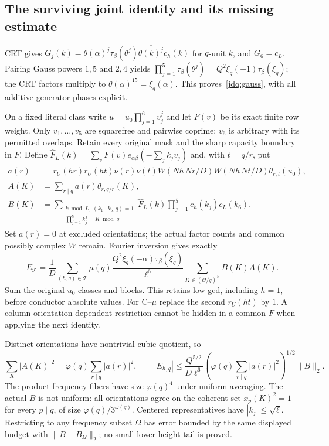 \subsection{The surviving joint identity and its missing estimate}\label{jdq:details}
CRT gives $G_j(k)=\theta(\alpha)^j\tau_\beta(\theta^j)
\overline{\theta(k)^j}c_h(k)$ for $q$-unit $k$, and $G_6=c_L$.
Pairing Gauss powers $1,5$ and $2,4$ yields
$\prod_{j=1}^5\tau_\beta(\theta^j)=Q^2\xi_q(-1)\tau_\beta(\xi_q)$;
the CRT factors multiply to $\theta(\alpha)^{15}=\xi_q(\alpha)$.
This proves~\eqref{jdq:gauss}, with all additive-generator phases explicit.

On a fixed literal class write $u=u_0\prod_{j=1}^6v_j^j$ and let $F(v)$
be its exact finite row weight. Only $v_1,\ldots,v_5$ are squarefree and
pairwise coprime; $v_6$ is arbitrary with its permitted overlaps.
Retain every original mask and the sharp capacity boundary in $F$.
Define $\widehat F_L(k)=\sum_vF(v)e_{\alpha\beta}(-\sum_jk_jv_j)$ and,
with $t=q/r$, put
\begin{align*}
 a(r)&=r_U(hr)r_U(ht)\nu(r)\overline{\nu(t)}
 W(Nh\,Nr/D)\overline{W(Nh\,Nt/D)}\theta_{r,t}(u_0),\\
 A(K)&=\sum_{r\mid q}a(r)\overline{\theta_{r,q/r}(K)},\\
 B(K)&=\sum_{\substack{k\bmod L,\ (k_1\cdots k_5,q)=1\\
                   \prod_{j=1}^5k_j^j=K\bmod q}}
       \widehat F_L(k)\prod_{j=1}^5c_h(k_j)c_L(k_6).
\end{align*}
Set $a(r)=0$ at excluded orientations; the actual factor counts and
common possibly complex $W$ remain. Fourier inversion gives exactly
\begin{equation}\label{jdq:joint}
 E_{\mathcal T}=\frac1D\sum_{(h,q)\in\mathcal T}
 \mu(q)\frac{Q^2\xi_q(-\alpha)\tau_\beta(\xi_q)}{\ell^6}
 \sum_{K\in(\mathcal O/q)^\times}B(K)A(K).
\end{equation}
Sum the original $u_0$ classes and blocks. This retains low gcd,
including $h=1$, before conductor absolute values. For C--$\mu$ replace
the second $r_U(ht)$ by $1$. A column-orientation-dependent restriction
cannot be hidden in a common $F$ when applying the next identity.

Distinct orientations have nontrivial cubic quotient, so
\[
 \sum_K|A(K)|^2=\varphi(q)\sum_{r\mid q}|a(r)|^2,\qquad
 |E_{h,q}|\le\frac{Q^{5/2}}{D\ell^6}
  \left(\varphi(q)\sum_{r\mid q}|a(r)|^2\right)^{1/2}\|B\|_2.
\]
The product-frequency fibers have size $\varphi(q)^4$ under uniform
averaging. The actual $B$ is not uniform: all orientations agree on
the coherent set $x_p(K)^2=1$ for every $p\mid q$, of size
$\varphi(q)/3^{\omega(q)}$. Centered representatives have
$|k_j|\le\sqrt\ell$. Restricting to any frequency subset $\Omega$ has
error bounded by the same displayed budget with $\|B-B_\Omega\|_2$;
no small lower-height tail is proved.

